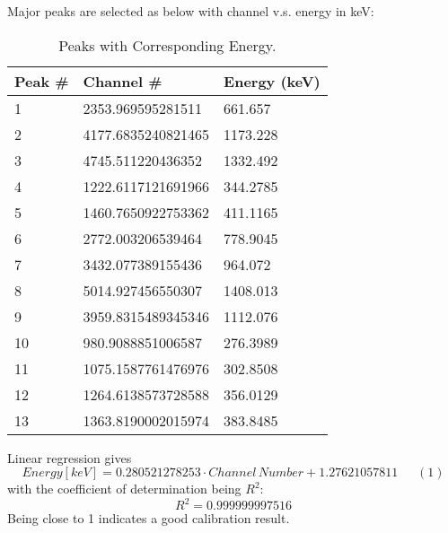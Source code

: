 Major peaks are selected as below with channel v.s. energy in keV:

\begin{table}[h!]
  \begin{center}
    \caption{Peaks with Corresponding Energy.}
    \label{tab:table1}
    \begin{tabular}{l|l|l}
      \textbf{Peak \#} & \textbf{Channel \#} & \textbf{Energy (keV)}\\
      \hline
      1 & 2353.969595281511 & 661.657\\
      2 & 4177.6835240821465 & 1173.228\\
      3 & 4745.511220436352  & 1332.492\\
      4 & 1222.6117121691966  & 344.2785\\
      5 & 1460.7650922753362  & 411.1165\\
      6 & 2772.003206539464  & 778.9045\\
      7 & 3432.077389155436 & 964.072\\
      8 & 5014.927456550307 & 1408.013\\
      9 & 3959.8315489345346 & 1112.076\\
      10 & 980.9088851006587  & 276.3989\\
      11 & 1075.1587761476976 & 302.8508\\
      12 & 1264.6138573728588 & 356.0129\\
      13 & 1363.8190002015974 & 383.8485\\
 
    \end{tabular}
  \end{center}
\end{table}
Linear regression gives
\[Energy[keV]=0.280521278253 \cdot Channel\,Number+1.27621057811\,\,\,\,\,\,\,\,\,(1)\]
with the coefficient of determination being ${R^2}$:
\[{R^2}=0.999999997516\]
Being close to 1 indicates a good calibration result.


